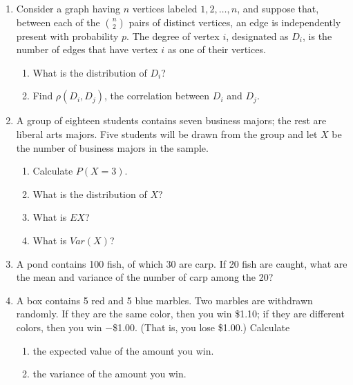 \documentclass[12pt]{article}%
\newcommand{\0}{{\bf 0}}
\begin{document}
\begin{enumerate}
\begin{enumerate}
\end{enumerate}




\item
Consider a graph having $n$ vertices labeled
$1,2,\ldots,n$, and suppose that, between each of the ${n\choose 2}$ pairs of distinct vertices, an edge is independently present with probability $p$. The degree of vertex $i$, designated as $D_i$, is the number of edges that have vertex $i$ as one of their vertices.
\begin{enumerate}
\item What is the distribution of $D_i$?

\item Find $\rho(D_i , D_j )$, the correlation between $D_i$ and $D_j$.



\end{enumerate}





\item
A group of eighteen students contains seven business majors; the rest are liberal arts majors. 
Five students will be drawn from the group and let $X$ be the number of business majors in the sample.
\begin{enumerate}
\item Calculate $P(X=3)$.


\item What is the distribution of $X$?


\item What is $EX$?


\item What is $Var(X)$?


\end{enumerate}



\item
A pond contains 100 fish, of which 30 are carp. If 20 fish are caught, what are the mean and variance of the number of carp among the 20? 






\item
A box contains 5 red and 5 blue marbles. Two marbles are withdrawn randomly. 
If they are the same color, then you win \$1.10; if they are different colors, then you win $-$\$1.00. (That is, you lose \$1.00.) Calculate
\begin{enumerate}
\item the expected value of the amount you win.

\item the variance of the amount you win.


\end{enumerate}


\end{enumerate}
\vskip 0.3in
\end{document}
